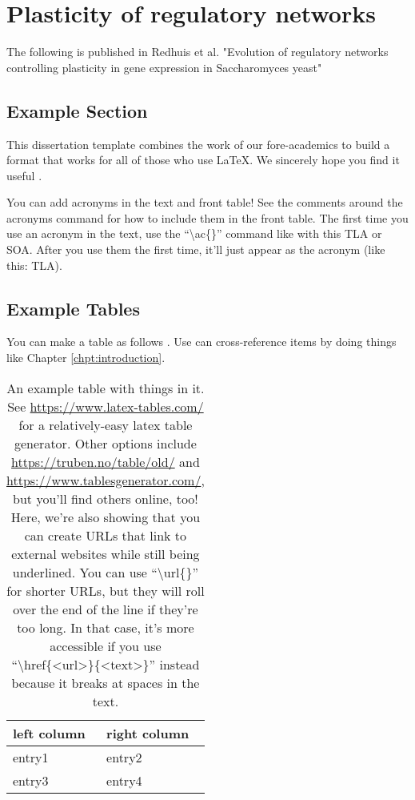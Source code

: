 \chapter{Plasticity of regulatory networks}
\label{chpt:plasticity}

The following is published in Redhuis et al. "Evolution of regulatory networks controlling plasticity in gene expression in Saccharomyces yeast"

\section{Example Section}
\label{sec:examplesec1}

This dissertation template combines the work of our fore-academics to build a format that works for all of those who use \LaTeX \cite{jefferson2019policing}. We sincerely hope you find it useful \cite{shannon1948mathematical}.

You can add acronyms in the text and front table! See the comments around the acronyms command for how to include them in the front table. The first time you use an acronym in the text, use the ``\textbackslash ac\{\}'' command like with this \ac{TLA} or \ac{SOA}. After you use them the first time, it'll just appear as the acronym (like this: \ac{TLA}).

\blindtext


\section{Example Tables}
\label{sec:examplesec2}

You can make a table as follows \cite{ong1997gilbert}. Use can cross-reference items by doing things like Chapter \ref{chpt:introduction}.

\blindtext

\begin{table}[ht]
    \begin{tabular}{l|l}
        \textbf{left column} & \textbf{right column} \\ \hline
        entry1 & entry2 \\
        entry3 & entry4
    \end{tabular}
    \caption{An example table with things in it. See \url{https://www.latex-tables.com/} for a relatively-easy latex table generator. Other options include \url{https://truben.no/table/old/} and \url{https://www.tablesgenerator.com/}, but you'll find others online, too! Here, we're also showing that you can create URLs that link to external websites while still being underlined. You can use ``\textbackslash url\{\}'' for shorter URLs, but they will roll over the end of the line if they're too long. In that case, it's more accessible if you use ``\textbackslash href\{\textless url\textgreater\}\{\textless text\textgreater\}'' instead because it breaks at spaces in the text.}
    \label{tab:my-table}
\end{table}

